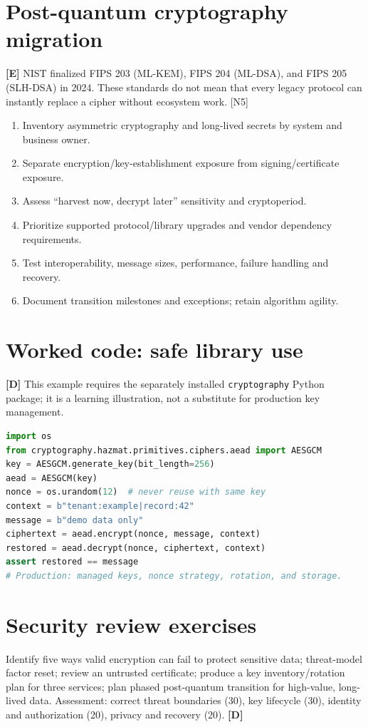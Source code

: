 \documentclass[10pt,letterpaper,oneside]{article}
\newcommand{\modernext}{\textsf{\color{muted}\textbf{[E]}}}
\newcommand{\designed}{\textsf{\color{accent}\textbf{[D]}}}
\begin{document}
\section{Post-quantum cryptography migration}\modernext{}
NIST finalized FIPS 203 (ML-KEM), FIPS 204 (ML-DSA), and FIPS 205 (SLH-DSA) in 2024. These standards do not mean that every legacy protocol can instantly replace a cipher without ecosystem work. [N5]
\begin{enumerate}
\item Inventory asymmetric cryptography and long-lived secrets by system and business owner.
\item Separate encryption/key-establishment exposure from signing/certificate exposure.
\item Assess ``harvest now, decrypt later'' sensitivity and cryptoperiod.
\item Prioritize supported protocol/library upgrades and vendor dependency requirements.
\item Test interoperability, message sizes, performance, failure handling and recovery.
\item Document transition milestones and exceptions; retain algorithm agility.
\end{enumerate}

\section{Worked code: safe library use}\designed{}
This example requires the separately installed \texttt{cryptography} Python package; it is a learning illustration, not a substitute for production key management.
\begin{lstlisting}[language=Python,caption={AES-GCM with associated tenant context}]
import os
from cryptography.hazmat.primitives.ciphers.aead import AESGCM
key = AESGCM.generate_key(bit_length=256)
aead = AESGCM(key)
nonce = os.urandom(12)  # never reuse with same key
context = b"tenant:example|record:42"
message = b"demo data only"
ciphertext = aead.encrypt(nonce, message, context)
restored = aead.decrypt(nonce, ciphertext, context)
assert restored == message
# Production: managed keys, nonce strategy, rotation, and storage.
\end{lstlisting}
\section{Security review exercises}
Identify five ways valid encryption can fail to protect sensitive data; threat-model factor reset; review an untrusted certificate; produce a key inventory/rotation plan for three services; plan phased post-quantum transition for high-value, long-lived data. Assessment: correct threat boundaries (30), key lifecycle (30), identity and authorization (20), privacy and recovery (20). \designed{}
\end{document}
